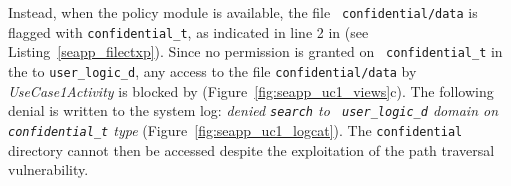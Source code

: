Instead, when the policy module is available, the file {\tt
  confidential/data} is flagged with {\tt confidential\_t}, as
indicated in line 2 in \filecontexts (see
Listing~\ref{seapp_filectxp}). Since no permission is granted on {\tt
  confidential\_t} in the \sepolicy to {\tt user\_logic\_d}, any
access to the file {\tt confidential/data} by {\em UseCase1Activity}
is blocked by \sel (Figure~\ref{fig:seapp_uc1_views}c). The following
denial is written to the system log: {\em denied {\tt search} to {\tt
    user\_logic\_d} domain on {\tt confidential\_t} type}
(Figure~\ref{fig:seapp_uc1_logcat}). The {\tt confidential} directory
cannot then be accessed despite the exploitation of the path traversal
vulnerability.

\begin{figure}[h!]
  \centering
  \hfill
  \hfill

\end{figure}
